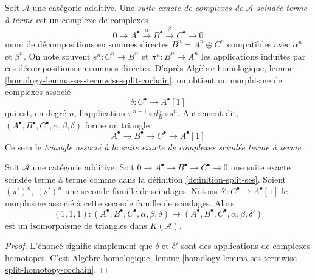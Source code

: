 \begin{definition}
\label{definition-split-ses}
Soit $\mathcal{A}$ une catégorie additive.
Une {\it suite exacte de complexes de $\mathcal{A}$ scindée terme à terme} est
un complexe de complexes
$$
0 \to
A^\bullet \xrightarrow{\alpha}
B^\bullet \xrightarrow{\beta}
C^\bullet \to 0
$$
muni de décompositions en sommes directes $B^n = A^n \oplus C^n$ compatibles
avec $\alpha^n$ et $\beta^n$.
On note souvent $s^n : C^n \to B^n$ et $\pi^n : B^n \to A^n$ les applications
induites par ces décompositions en sommes directes.
D'après Algèbre homologique, lemme
\ref{homology-lemma-ses-termwise-split-cochain}, on obtient un morphisme de
complexes associé
$$
\delta : C^\bullet \longrightarrow A^\bullet[1]
$$
qui est, en degré $n$, l'application $\pi^{n + 1} \circ d_B^n \circ s^n$.
Autrement dit,
$(A^\bullet, B^\bullet, C^\bullet, \alpha, \beta, \delta)$ forme un triangle
$$
A^\bullet \to B^\bullet \to C^\bullet \to A^\bullet[1]
$$
Ce sera le {\it triangle associé à la suite exacte de complexes scindée terme
à terme}.
\end{definition}

\begin{lemma}
\label{lemma-triangle-independent-splittings}
Soit $\mathcal{A}$ une catégorie additive. Soit
$0 \to A^\bullet \to B^\bullet \to C^\bullet \to 0$ une suite exacte scindée
terme à terme comme dans la définition \ref{definition-split-ses}.
Soient $(\pi')^n$, $(s')^n$ une seconde famille de scindages.
Notons $\delta' : C^\bullet \longrightarrow A^\bullet[1]$ le morphisme associé
à cette seconde famille de scindages. Alors
$$
(1, 1, 1) :
(A^\bullet, B^\bullet, C^\bullet, \alpha, \beta, \delta)
\longrightarrow
(A^\bullet, B^\bullet, C^\bullet, \alpha, \beta, \delta')
$$
est un isomorphisme de triangles dans $K(\mathcal{A})$.
\end{lemma}

\begin{proof}
L'énoncé signifie simplement que $\delta$ et $\delta'$ sont des applications
de complexes homotopes. C'est Algèbre homologique, lemme
\ref{homology-lemma-ses-termwise-split-homotopy-cochain}.
\end{proof}

